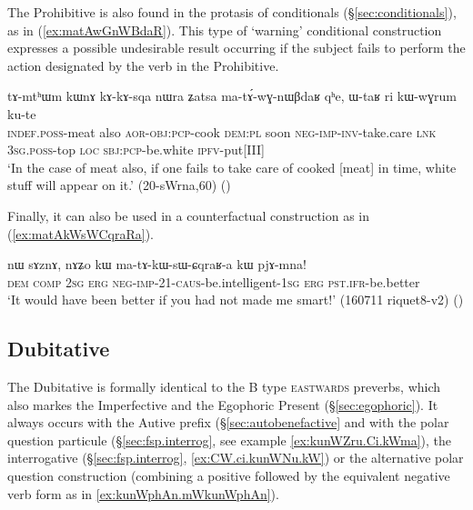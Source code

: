 The Prohibitive is also found in the protasis of conditionals (§\ref{sec:conditionals}), as in (\ref{ex:matAwGnWBdaR}). This type of `warning' conditional construction expresses a possible undesirable result occurring if the subject fails to perform the action designated by the verb in the Prohibitive.

\begin{exe}
\ex  \label{ex:matAwGnWBdaR}
\gll  tɤ-mtʰɯm kɯnɤ kɤ-kɤ-sqa nɯra ʑatsa ma-tɤ́-wɣ-nɯβdaʁ qʰe, ɯ-taʁ ri kɯ-wɣrum ku-te \\
\textsc{indef}.\textsc{poss}-meat also \textsc{aor}-\textsc{obj}:\textsc{pcp}-cook \textsc{dem}:\textsc{pl} soon \textsc{neg}-\textsc{imp}-\textsc{inv}-take.care \textsc{lnk} \textsc{3sg}.\textsc{poss}-top \textsc{loc} \textsc{sbj}:\textsc{pcp}-be.white \textsc{ipfv}-put[III] \\
\glt `In the case of meat also, if one fails to take care of cooked [meat] in time, white stuff will appear on it.' (20-sWrna,60)
()
\end{exe}
 
Finally, it can also be used in a counterfactual construction as in (\ref{ex:matAkWsWCqraRa}).

\begin{exe}
\ex  \label{ex:matAkWsWCqraRa}
\gll nɯ sɤznɤ, nɤʑo kɯ ma-tɤ-kɯ-sɯ-ɕqraʁ-a kɯ pjɤ-mna! \\
\textsc{dem} \textsc{comp} \textsc{2sg} \textsc{erg} \textsc{neg}-\textsc{imp}-2\fl{}1-\textsc{caus}-be.intelligent-\textsc{1sg} \textsc{erg} \textsc{pst}.\textsc{ifr}-be.better \\
\glt `It would have been better if you had not made me smart!' (160711 riquet8-v2) ()
\end{exe}

\subsection{Dubitative} \label{sec:dubitative}
 The Dubitative  is formally identical to the B type \textsc{eastwards} preverbs, which also markes the Imperfective and the Egophoric Present (§\ref{sec:egophoric}). It always occurs with the Autive  prefix (§\ref{sec:autobenefactive}  and with the polar question  particule (§\ref{sec:fsp.interrog}, see example \ref{ex:kunWZru.Ci.kWma}), the interrogative  (§\ref{sec:fsp.interrog}, \ref{ex:CW.ci.kunWNu.kW}) or the alternative polar question construction (combining a positive followed by the equivalent negative verb form as in \ref{ex:kunWphAn.mWkunWphAn}).
 
